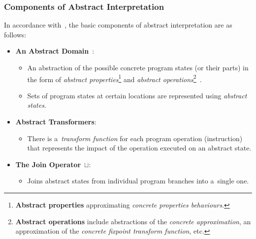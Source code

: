 \subsubsection{Components of Abstract Interpretation}

In accordance with~\cite{savAI, harmimBP}, the basic
components of abstract interpretation are as follows:
\begin{itemize}
    \item
        \textbf{An Abstract Domain}~\cite{AICousotWeb}:

        \begin{itemize}
            \item
                An abstraction of the possible concrete program states
                (or their parts) in the form of \emph{abstract
                properties}\footnote{\textbf{Abstract properties}
                approximating \emph{concrete properties behaviours}.}
                and \emph{abstract operations}\footnote{\textbf{Abstract
                operations} include abstractions of the \emph{concrete
                approximation}, an approximation of the \emph{concrete
                fixpoint transform function},
                etc.}~\cite{AIBasedFormalMethodsCousot}.

            \item
                Sets of program states at certain locations are represented
                using \emph{abstract states}.
        \end{itemize}

    \item
        \textbf{Abstract Transformers}:

        \begin{itemize}
            \item
                There is a~\emph{transform function} for each program
                operation (instruction) that represents the impact
                of the operation executed on an abstract state.
        \end{itemize}

    \item
        \textbf{The Join Operator}~$ \sqcup $:

        \begin{itemize}
            \item
                Joins abstract states from individual program branches into
                a~single one.
        \end{itemize}


\end{itemize}
